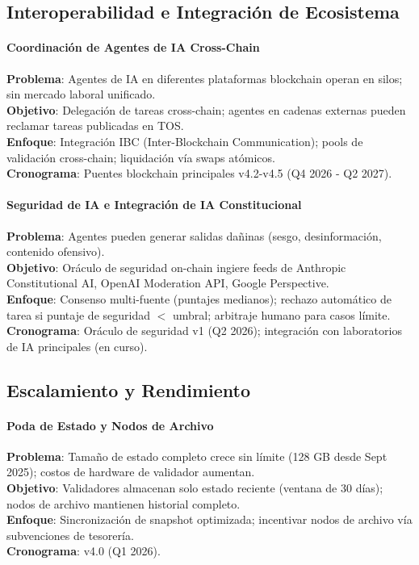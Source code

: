 \documentclass[11pt]{article}
\begin{document}
\subsection{Interoperabilidad e Integración de Ecosistema}

\paragraph{Coordinación de Agentes de IA Cross-Chain}
\textbf{Problema}: Agentes de IA en diferentes plataformas blockchain operan en silos; sin mercado laboral unificado.\\
\textbf{Objetivo}: Delegación de tareas cross-chain; agentes en cadenas externas pueden reclamar tareas publicadas en TOS.\\
\textbf{Enfoque}: Integración IBC (Inter-Blockchain Communication); pools de validación cross-chain; liquidación vía swaps atómicos.\\
\textbf{Cronograma}: Puentes blockchain principales v4.2-v4.5 (Q4 2026 - Q2 2027).

\paragraph{Seguridad de IA e Integración de IA Constitucional}
\textbf{Problema}: Agentes pueden generar salidas dañinas (sesgo, desinformación, contenido ofensivo).\\
\textbf{Objetivo}: Oráculo de seguridad on-chain ingiere feeds de Anthropic Constitutional AI, OpenAI Moderation API, Google Perspective.\\
\textbf{Enfoque}: Consenso multi-fuente (puntajes medianos); rechazo automático de tarea si puntaje de seguridad $<$ umbral; arbitraje humano para casos límite.\\
\textbf{Cronograma}: Oráculo de seguridad v1 (Q2 2026); integración con laboratorios de IA principales (en curso).

\subsection{Escalamiento y Rendimiento}

\paragraph{Poda de Estado y Nodos de Archivo}
\textbf{Problema}: Tamaño de estado completo crece sin límite (128 GB desde Sept 2025); costos de hardware de validador aumentan.\\
\textbf{Objetivo}: Validadores almacenan solo estado reciente (ventana de 30 días); nodos de archivo mantienen historial completo.\\
\textbf{Enfoque}: Sincronización de snapshot optimizada; incentivar nodos de archivo vía subvenciones de tesorería.\\
\textbf{Cronograma}: v4.0 (Q1 2026).
\end{document}
